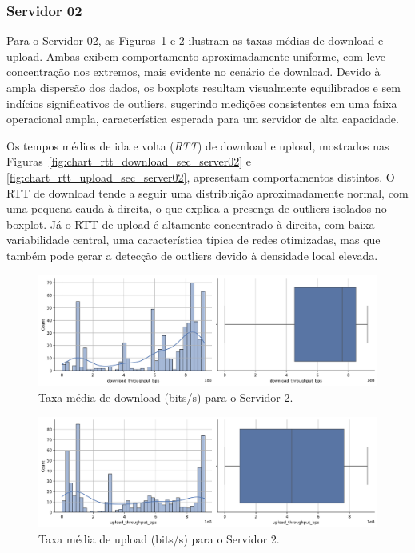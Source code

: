 \documentclass{article}
\begin{document}
\subsubsection{Servidor 02}

Para o Servidor 02, as Figuras~\ref{fig:chart_download_throughput_bps_server02} e \ref{fig:chart_upload_throughput_bps_server02} ilustram as taxas médias de download e upload.  
Ambas exibem comportamento aproximadamente uniforme, com leve concentração nos extremos, mais evidente no cenário de download.  
Devido à ampla dispersão dos dados, os boxplots resultam visualmente equilibrados e sem indícios significativos de outliers, sugerindo medições consistentes em uma faixa operacional ampla, característica esperada para um servidor de alta capacidade.

Os tempos médios de ida e volta (\textit{RTT}) de download e upload, mostrados nas Figuras~\ref{fig:chart_rtt_download_sec_server02} e \ref{fig:chart_rtt_upload_sec_server02}, apresentam comportamentos distintos.  
O RTT de download tende a seguir uma distribuição aproximadamente normal, com uma pequena cauda à direita, o que explica a presença de outliers isolados no boxplot.  
Já o RTT de upload é altamente concentrado à direita, com baixa variabilidade central, uma característica típica de redes otimizadas, mas que também pode gerar a detecção de outliers devido à densidade local elevada.

\begin{figure}[H]
	\includegraphics[width=\textwidth]{../figures/eda/chart_download_throughput_bps_server02.png}
	\caption{Taxa média de download (bits/s) para o Servidor 2.}
	\label{fig:chart_download_throughput_bps_server02}
\end{figure}

\begin{figure}[H]
	\includegraphics[width=\textwidth]{../figures/eda/chart_upload_throughput_bps_server02.png}
	\caption{Taxa média de upload (bits/s) para o Servidor 2.}
	\label{fig:chart_upload_throughput_bps_server02}
\end{figure}
\end{document}

